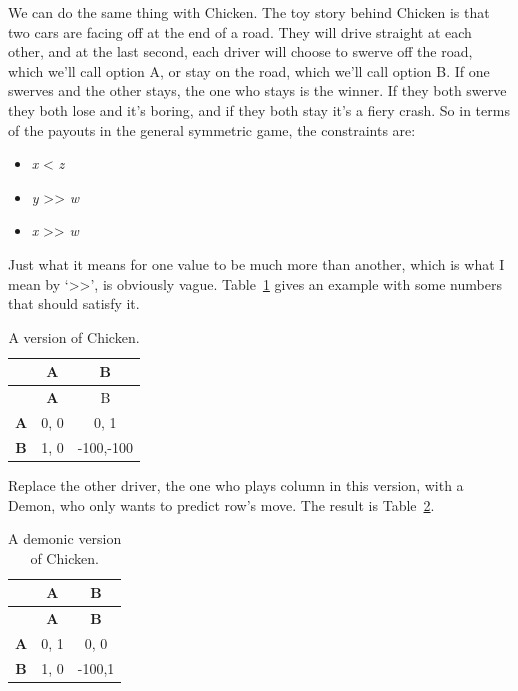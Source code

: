 \documentclass[
  12pt,
  letterpaper,
  DIV=11,
  numbers=noendperiod]{scrreprt}
\providecommand{\tightlist}{%
  \setlength{\itemsep}{0pt}\setlength{\parskip}{0pt}}\usepackage{longtable,booktabs,array}
\begin{document}
We can do the same thing with Chicken. The toy story behind Chicken is
that two cars are facing off at the end of a road. They will drive
straight at each other, and at the last second, each driver will choose
to swerve off the road, which we'll call option A, or stay on the road,
which we'll call option B. If one swerves and the other stays, the one
who stays is the winner. If they both swerve they both lose and it's
boring, and if they both stay it's a fiery crash. So in terms of the
payouts in the general symmetric game, the constraints are:

\begin{itemize}
\tightlist
\item
  \emph{x} \textless{} \emph{z}
\item
  \emph{y} \textgreater\textgreater{} \emph{w}
\item
  \emph{x} \textgreater\textgreater{} \emph{w}
\end{itemize}

Just what it means for one value to be much more than another, which is
what I mean by `\textgreater\textgreater{}', is obviously vague.
Table~\ref{tbl-basic-chicken} gives an example with some numbers that
should satisfy it.

\begin{longtable}[]{@{}ccc@{}}
\caption{A version of Chicken.}\label{tbl-basic-chicken}\tabularnewline
\toprule\noalign{}
& \textbf{A} & B \\
\midrule\noalign{}
\endfirsthead
\toprule\noalign{}
& \textbf{A} & B \\
\midrule\noalign{}
\endhead
\bottomrule\noalign{}
\endlastfoot
\textbf{A} & 0, 0 & 0, 1 \\
\textbf{B} & 1, 0 & -100,-100 \\
\end{longtable}

Replace the other driver, the one who plays column in this version, with
a Demon, who only wants to predict row's move. The result is
Table~\ref{tbl-demon-chicken}.

\begin{longtable}[]{@{}ccc@{}}
\caption{A demonic version of
Chicken.}\label{tbl-demon-chicken}\tabularnewline
\toprule\noalign{}
& \textbf{A} & \textbf{B} \\
\midrule\noalign{}
\endfirsthead
\toprule\noalign{}
& \textbf{A} & \textbf{B} \\
\midrule\noalign{}
\endhead
\bottomrule\noalign{}
\endlastfoot
\textbf{A} & 0, 1 & 0, 0 \\
\textbf{B} & 1, 0 & -100,1 \\
\end{longtable}
\end{document}
